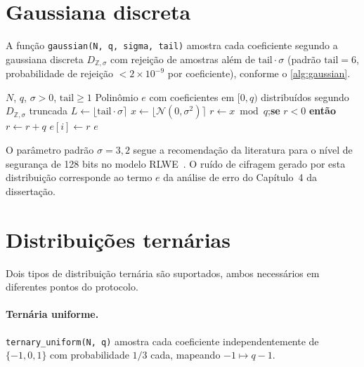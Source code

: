 \documentclass[11pt,a4paper]{report}
\begin{document}
\section{Gaussiana discreta}
\label{sec:gaussian}

A função \texttt{gaussian(N, q, sigma, tail)} amostra cada coeficiente segundo a
gaussiana discreta $D_{\mathbb{Z}, \sigma}$ com rejeição de amostras além de
$\text{tail} \cdot \sigma$ (padrão $\text{tail} = 6$, probabilidade de rejeição
$< 2 \times 10^{-9}$ por coeficiente), conforme o \cref{alg:gaussian}.

\begin{algorithm}[ht]
\caption{\texttt{gaussian}: amostragem da gaussiana discreta com rejeição}
\label{alg:gaussian}
\begin{algorithmic}[1]
\Require $N$, $q$, $\sigma > 0$, $\text{tail} \geq 1$
\Ensure Polinômio $e$ com coeficientes em $[0,q)$ distribuídos segundo $D_{\mathbb{Z},\sigma}$ truncada
\State $L \gets \lfloor \text{tail} \cdot \sigma \rceil$
  \Repeat
    \State $x \gets \lfloor \mathcal{N}(0, \sigma^2) \rceil$
  \State $r \gets x \bmod q$;\quad \textbf{se} $r < 0$ \textbf{então} $r \gets r + q$
  \State $e[i] \gets r$
\EndFor
\State \Return $e$
\end{algorithmic}
\end{algorithm}

O parâmetro padrão $\sigma = 3{,}2$ segue a recomendação da literatura para o nível
de segurança de 128 bits no modelo RLWE~\cite{Cheon2017}. O ruído de cifragem gerado
por esta distribuição corresponde ao termo $e$ da análise de erro do Capítulo~4 da
dissertação.

\section{Distribuições ternárias}
\label{sec:ternary}

Dois tipos de distribuição ternária são suportados, ambos necessários em diferentes
pontos do protocolo.

\paragraph{Ternária uniforme.} \texttt{ternary\_uniform(N, q)} amostra cada coeficiente
independentemente de $\{-1, 0, 1\}$ com probabilidade $1/3$ cada, mapeando
$-1 \mapsto q-1$.
\end{document}
